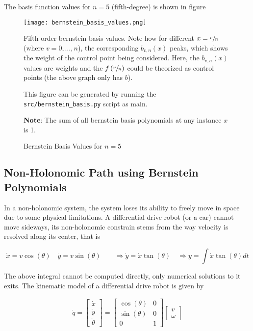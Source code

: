 The basis function values for $n=5$ (fifth-degree) is shown in figure 

\begin{figure}[ht]
    \centering
    \texttt{[image: bernstein\_basis\_values.png]}
    \caption{Bernstein Basis Values for $n=5$}
    \label{fig:bernstein-basis-plots}
    \small
        Fifth order bernstein basis values. Note how for different $x = \sfrac{v}{n}$ (where $v = 0,\dots,n$), the corresponding $b_{v,n}(x)$ peaks, which shows the weight of the control point being considered. Here, the $b_{v,n}(x)$ values are weights and the $f\left(\sfrac{v}{n}\right)$ could be theorized as control points (the above graph only has $b$).

        This figure can be generated by running the \texttt{src/bernstein\_basis.py} script as main.

        \textbf{Note}: The sum of all bernstein basis polynomials at any instance $x$ is 1.
\end{figure}

\subsection{Non-Holonomic Path using Bernstein Polynomials}

In a non-holonomic system, the system loses its ability to freely move in space due to some physical limitations. A differential drive robot (or a car) cannot move sideways, its non-holonomic constrain stems from the way velocity is resolved along its center, that is

\begin{equation}
    \dot{x} = v \cos(\theta) \quad 
    \dot{y} = v \sin(\theta) \quad\quad
    \Rightarrow \dot{y} = \dot{x} \tan(\theta) \quad
    \Rightarrow y = \int{\dot{x} \tan \left ( \theta \right ) dt}
    \label{eq:diffdrive-non-holo-constraint}
\end{equation}

The above integral cannot be computed directly, only numerical solutions to it exits. The kinematic model of a differential drive robot is given by

\begin{align*}
    \dot{q} = \begin{bmatrix}
        \dot{x} \\ \dot{y} \\ \dot{\theta}
    \end{bmatrix} = \begin{bmatrix}
    \cos(\theta) & 0 \\
    \sin(\theta) & 0 \\
    0 & 1
    \end{bmatrix} \begin{bmatrix}
    v \\ \omega
    \end{bmatrix}
\end{align*}

